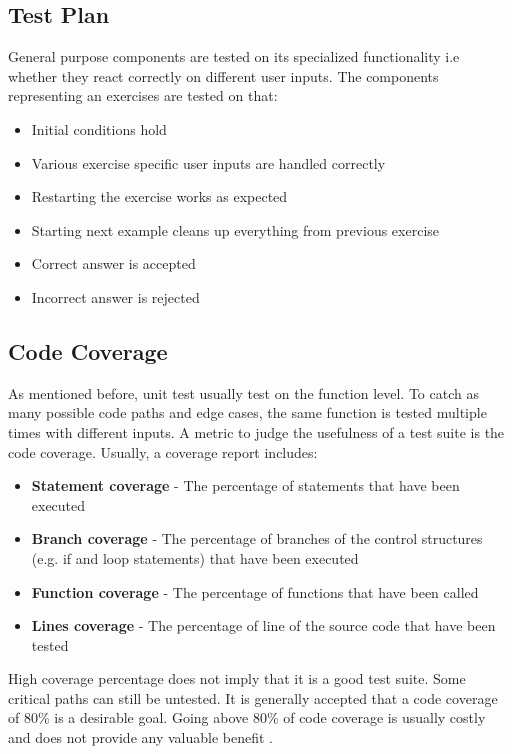 \subsection*{Test Plan}

General purpose components are tested on its specialized functionality i.e whether they react correctly on different user inputs. The components representing an exercises are tested on that:

\begin{itemize}
    \item Initial conditions hold
    \item Various exercise specific user inputs are handled correctly
    \item Restarting the exercise works as expected
    \item Starting next example cleans up everything from previous exercise
    \item Correct answer is accepted
    \item Incorrect answer is rejected
\end{itemize}

\subsection*{Code Coverage}
As mentioned before, unit test usually test on the function level. To catch as many possible code paths and edge cases, the same function is tested multiple times with different inputs. 
A metric to judge the usefulness of a test suite is the code coverage. Usually, a coverage report includes:

\begin{itemize}
    \item \textbf{Statement coverage} - The percentage of statements that have been executed 
    \item \textbf{Branch coverage} - The percentage of branches of the control structures (e.g. if and loop statements) that have been executed
    \item \textbf{Function coverage} - The percentage of functions that have been called
    \item \textbf{Lines coverage} - The percentage of line of the source code that have been tested
\end{itemize}

High coverage percentage does not imply that it is a good test suite. Some critical paths can still be untested. It is generally accepted that a code coverage of 80\% is a desirable goal. Going above 80\% of code coverage is usually costly and does not provide any valuable benefit \cite{CodeCoverage}.

